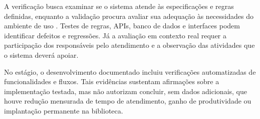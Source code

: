 A verificação busca examinar se o sistema atende às especificações e regras definidas, enquanto a validação procura avaliar sua adequação às necessidades do ambiente de uso \cite{sommerville2016}. Testes de regras, APIs, banco de dados e interfaces podem identificar defeitos e regressões. Já a avaliação em contexto real requer a participação dos responsáveis pelo atendimento e a observação das atividades que o sistema deverá apoiar.

No estágio, o desenvolvimento documentado incluiu verificações automatizadas de funcionalidades e fluxos. Tais evidências sustentam afirmações sobre a implementação testada, mas não autorizam concluir, sem dados adicionais, que houve redução mensurada de tempo de atendimento, ganho de produtividade ou implantação permanente na biblioteca.
